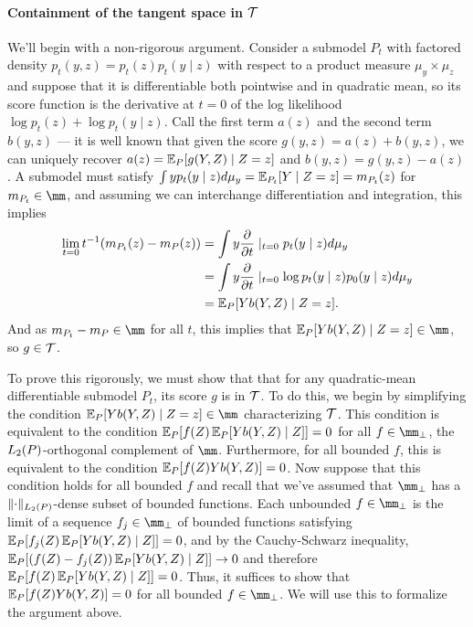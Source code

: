 \paragraph*{Containment of the tangent space in $\mathcal{T}$}
We'll begin with a non-rigorous argument. 
Consider a submodel $P_t$ with factored density $p_t(y,z)=p_t(z) p_t(y \mid z)$ with respect to a product measure $\mu_y \times \mu_z$
and suppose that it is differentiable both pointwise and in quadratic mean, so its score
function is the derivative at $t=0$ of the log likelihood $\log p_t (z) + \log p_t(y \mid z)$.
Call the first term $a(z)$ and the second term $b(y,z)$ --- it is well known that given the score 
$g(y,z)=a(z)+b(y,z)$, we can uniquely recover $a(z)=\E_P[g(Y,Z) \mid Z=z]$ and $b(y,z)=g(y,z)-a(z)$.
A submodel must satisfy $\int y p_t(y \mid z)d\mu_y =\E_{P_t}[Y \mid Z=z] = m_{P_t}(z)$ for $m_{P_t} \in \mm$, 
and assuming we can interchange differentiation and integration,
this implies  
\begin{align*} 
\lim_{t=0}t^{-1}(m_{P_t}(z) - m_P(z))
&= \int y \frac{\partial}{\partial t}\mid_{t=0} p_t(y \mid z) d\mu_y \\
&= \int y \frac{\partial}{\partial t}\mid_{t=0} \log p_t(y \mid z) p_0(y \mid z) d\mu_y \\
&= \E_{P}[Y b(Y,Z) \mid Z=z]. 
\end{align*}
And as $m_{P_t} - m_P \in \mm$ for all $t$, this implies that $\E_{P}[Y b(Y,Z) \mid Z=z] \in \mm$,
so $g \in \mathcal{T}$.


To prove this rigorously, we must show that that for any quadratic-mean differentiable submodel $P_t$,
its score $g$ is in $\mathcal{T}$. To do this, we begin by simplifying the condition $\E_P[Y b(Y,Z) \mid Z=z] \in \mm$ 
characterizing $\mathcal{T}$. This condition is equivalent to the condition $\E_P[f(Z) \E_P[Y b(Y,Z) \mid Z]]=0$
for all $f \in \mm_{\perp}$, the $L_2(\P)$-orthogonal complement of $\mm$. Furthermore, for all bounded $f$,
this is equivalent to the condition $\E_P[f(Z) Y  b(Y,Z)]=0$. Now suppose that this condition holds for all bounded $f$
and recall that we've assumed that $\mm_{\perp}$ has a $\lVert\cdot\rVert_{L_2(P)}$-dense subset of bounded functions.
Each unbounded $f \in \mm_{\perp}$ is the limit of a sequence $f_j \in \mm_{\perp}$ of bounded functions satisfying
$\E_P[f_j(Z) \E_P[Y b(Y,Z) \mid Z]]=0$, and by the Cauchy-Schwarz inequality, $\E_P[(f(Z)-f_j(Z)) \E_P[Y b(Y,Z) \mid Z]] \to 0$ 
and therefore $\E_P[f(Z) \E_P[Y b(Y,Z) \mid Z]] = 0$. Thus, it suffices to show that $\E_P[f(Z) Y b(Y,Z)]=0$ 
for all bounded $f \in \mm_{\perp}$. We will use this to formalize the argument above. 


